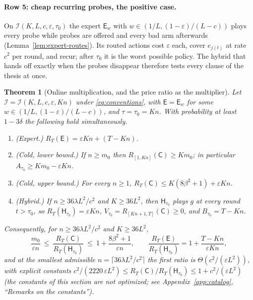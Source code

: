 \documentclass{article}
\newtheorem{theorem}{Theorem}
\theoremstyle{definition}
\theoremstyle{remark}
\newcommand{\eps}{\varepsilon}
\theoremstyle{remark}
\newcommand{\Cold}{\mathsf{C}}
\newcommand{\Exp}{\mathsf{E}}
\newcommand{\Hyb}{\mathsf{H}}
\begin{document}
\paragraph{Row 5: cheap recurring probes, the positive case.}
On $\mathcal I(K,L,c,\eps,\tau_0)$ the expert $\Exp_w$ with
$w\in(1/L,(1-\eps)/(L-c))$ plays every probe while probes are offered and
every bad arm afterwards (Lemma~\ref{lem:expert-routes}). Its routed actions
cost $\eps$ each, cover $e_{j(t)}$ at rate $c^2$ per round, and recur; after
$\tau_0$ it is the worst possible policy. The hybrid that hands off exactly
when the probes disappear therefore tests every clause of the thesis at once.

\begin{theorem}[Online multiplication, and the price ratio as the multiplier]
\label{thm:price}
Let $\mathcal I=\mathcal I(K,L,c,\eps,Kn)$ under \eqref{eq:conventions}, with
$\Exp=\Exp_w$ for some $w\in(1/L,(1-\eps)/(L-c))$, and $\tau=\tau_0=Kn$. With
probability at least $1-3\delta$ the following hold simultaneously.
\begin{enumerate}[itemsep=1pt,topsep=1pt,leftmargin=*]
\item[(i)] \emph{(Expert.)} $R_T(\Exp)=\eps Kn+(T-Kn)$.
\item[(ii)] \emph{(Cold, lower bound.)} If $n\ge m_0$ then
$R_{[1,Kn]}(\Cold)\ge Km_0$; in particular $A_{\tau_0}\ge Km_0-\eps Kn$.
\item[(iii)] \emph{(Cold, upper bound.)} For every $n\ge1$, $R_T(\Cold)\le K(8\beta^2+1)+\eps Kn$.
\item[(iv)] \emph{(Hybrid.)} If $n\ge36\lambda L^2/c^2$ and $K\ge36L^2$, then
$\Hyb_{\tau_0}$ plays $g$ at every round $t>\tau_0$, so
$R_T(\Hyb_{\tau_0})=\eps Kn$, $V_{\tau_0}=R_{[Kn+1,T]}(\Cold)\ge0$, and
$B_{\tau_0}=T-Kn$.
\end{enumerate}
Consequently, for $n\ge36\lambda L^2/c^2$ and $K\ge36L^2$,
\begin{equation}
\label{eq:price-ratio}
\frac{m_0}{\eps n}\ \le\ \frac{R_T(\Cold)}{R_T(\Hyb_{\tau_0})}\ \le\ 1+\frac{8\beta^2+1}{\eps n},
\qquad
\frac{R_T(\Exp)}{R_T(\Hyb_{\tau_0})}=1+\frac{T-Kn}{\eps Kn},
\end{equation}
and at the smallest admissible $n=\lceil36\lambda L^2/c^2\rceil$ the first
ratio is $\Theta(c^2/(\eps L^2))$, with explicit constants
$c^2/(2220\,\eps L^2)\le R_T(\Cold)/R_T(\Hyb_{\tau_0})\le1+c^2/(\eps L^2)$
(the constants of this section are not optimized; see
Appendix~\ref{app:catalog}, ``Remarks on the constants'').
\end{theorem}
\end{document}
